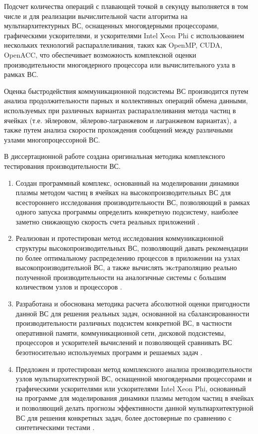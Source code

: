 Подсчет количества операций с плавающей точкой в секунду выполняется в том числе и  для реализации вычислительной части алгоритма на мультиархитектурных ВС, оснащенных многоядерными процессорами, графическими ускорителями, и ускорителями Intel Xeon Phi с использованием нескольких технологий распараллеливания, таких как OpenMP, CUDA, OpenACC, что обеспечивает возможность комплексной оценки производительности многоядерного  процессора или вычислительного узла в рамках ВС.

Оценка быстродействия коммуникационной подсистемы ВС производится путем анализа продолжительности парных и коллективных операций обмена данными, используемых при различных вариантах распараллеливания метода частиц в ячейках (т.е. эйлеровом, эйлерово-лагранжевом и лагранжевом вариантах), а также путем анализа скорости прохождения сообщений между различными узлами многопроцессорной ВС.    

В диссертационной работе создана оригинальная методика комплексного тестирования производительности ВС.
 
{}
\begin{enumerate}
\item Создан программный комплекс, основанный на моделировании динамики плазмы методом частиц в ячейках на высокопроизводительных ВС для всестороннего исследования производительности ВС, позволяющий в рамках одного запуска программы определить конкретную подсистему, наиболее заметно снижающую скорость счета реальных приложений \cite{LotovPoP,MatMod,VychMetPlasma,VestnikNNSU,adaptCPC}. 

\item Реализован и протестирован метод исследования коммуникационной структуры высокопроизводительных ВС, позволяющий давать рекомендации по более оптимальному распределению процессов в приложении на узлах высокопроизводительной ВС, а также вычислять экcтраполяцию реально полученной производительности на аналогичные системы с большим количеством узлов и процессоров \cite{VestnikNSUadapt,VestnikNNSU}.

\item Разработана и обоснована методика расчета абсолютной оценки пригодности данной ВС для решения реальных задач, основанной на сбалансированности производительности различных подсистем конкретной ВС, в частности оперативной памяти, коммуникационной сети, дисковой подсистемы, процессоров и ускорителей вычислений и позволяющей сравнивать ВС безотносительно используемых программ и решаемых задач \cite{multigridAuto,VestnikNNSU,SuperFrI,astroCoDesign,integrApproach,NumMethMultiLevel}. 

\item Предложен и протестирован метод комплексного анализа производительности узлов мультиархитектурной ВС, оснащенной многоядерными процессорами и графическими ускорителями или ускорителями Intel Xeon Phi, основанный на программе для моделирования динамики плазмы методом частиц в ячейках и позволяющий делать прогнозы эффективности данной мультиархитектурной ВС для решения конкретных задач, более достоверные по сравнению с синтетическими тестами  \cite{MohographyTarkov,VestnikNSU3D,MatMod,VychMethProgExa}.
\end{enumerate}

